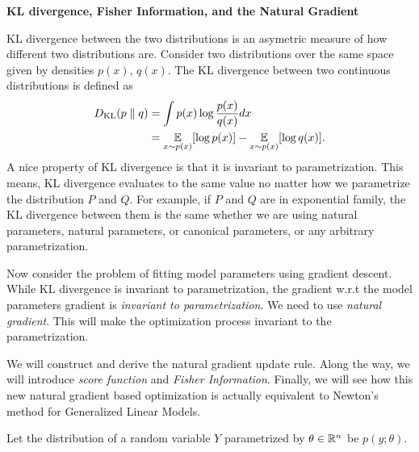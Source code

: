 \documentclass[12pt,letterpaper,boxed]{hmcpset}
\newcommand{\DKL}[2]{D_{\mathrm{KL}}(#1 \parallel #2)}
\begin{document}
\begin{problem}[Problem 3]
  \textbf{KL divergence, Fisher Information, and the Natural Gradient}

  KL divergence between the two distributions is an asymetric measure of how different two distributions are. Consider two distributions over the same space given by densities $p(x)$, $q(x)$. The KL divergence between two continuous distributions is defined as
  \[
  \begin{aligned}
    \DKL{p}{q} &= \int p(x) \log \frac{p(x)}{q(x)} dx \\
    &= \E_{x \sim p(x)}[\log p(x)] - \E_{x \sim p(x)} [\log q(x)].
  \end{aligned}
  \]
  A nice property of KL divergence is that it is invariant to parametrization. This means, KL divergence evaluates to the same value no matter how we parametrize the distribution $P$ and $Q$. For example, if $P$ and $Q$ are in exponential family, the KL divergence between them is the same whether we are using natural parameters, natural parameters, or canonical parameters, or any arbitrary parametrization.

  Now consider the problem of fitting model parameters using gradient descent. While KL divergence is invariant to parametrization, the gradient w.r.t the model parameters gradient is \emph{invariant to parametrization}. We need to use \emph{natural gradient}. This will make the optimization process invariant to the parametrization.

  We will construct and derive the natural gradient update rule. Along the way, we will introduce \emph{score function} and \emph{Fisher Information}. Finally, we will see how this new natural gradient based optimization is actually equivalent to Newton's method for Generalized Linear Models.

  Let the distribution of a random variable $Y$ parametrized by $\theta \in \mathbb{R}^n$ be $p(y; \theta)$.
\end{problem}
\end{document}
